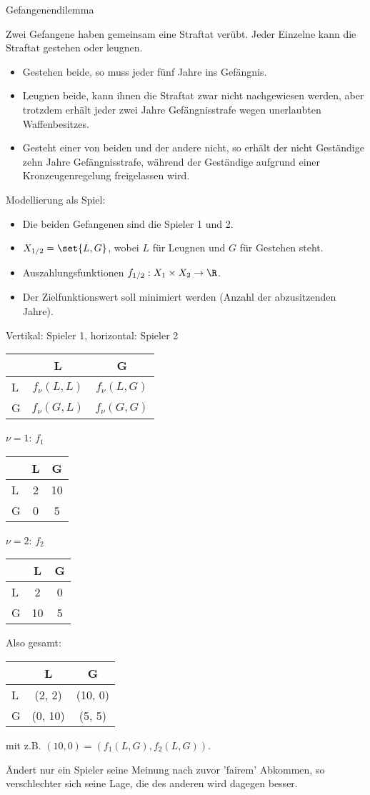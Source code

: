 \begin{beispiel} Gefangenendilemma

Zwei Gefangene haben gemeinsam eine Straftat verübt. Jeder Einzelne kann die Straftat gestehen oder leugnen.
\begin{itemize}
\item Gestehen beide, so muss jeder fünf Jahre ins Gefängnis.
\item Leugnen beide, kann ihnen die Straftat zwar nicht nachgewiesen werden, aber trotzdem erhält jeder zwei Jahre Gefängnisstrafe wegen unerlaubten Waffenbesitzes. 
\item Gesteht einer von beiden und der andere nicht, so erhält der nicht Geständige zehn Jahre Gefängnisstrafe, während der Geständige aufgrund einer Kronzeugenregelung freigelassen wird.  
\end{itemize}
Modellierung als Spiel:
\begin{itemize}
\item Die beiden Gefangenen sind die Spieler 1 und 2. 
\item $X_{1/2} = \set{L, G}$, wobei $L$ für Leugnen und $G$ für Gestehen steht. 
\item Auszahlungsfunktionen $f_{1/2}: X_{1} \times X_{2} \to \R$. 
\item Der Zielfunktionswert soll minimiert werden (Anzahl der abzusitzenden Jahre). 
\end{itemize}

Vertikal: Spieler 1, horizontal: Spieler 2

\begin{tabular}[h!]{l| c c}
    & L & G \\\hline 
  L & $f_{\nu}(L, L)$ & $f_{\nu}(L, G)$ \\ 
  G &$ f_{\nu}(G, L)$ & $f_{\nu}(G, G)$ 
\end{tabular}

\vspace{3mm}

$\nu = 1$: $f_{1}$
\begin{tabular}[h!]{l| c c}
    & L & G \\\hline 
  L & 2 & 10 \\ 
  G & 0 &  5 
\end{tabular}

$\nu = 2$: $f_{2}$
\begin{tabular}[h!]{l| c c}
    & L & G \\\hline 
  L &  2& 0 \\
  G & 10& 5
\end{tabular}

\vspace{3mm}

Also gesamt: 
\begin{tabular}[h!]{l| c c}
    & L & G \\\hline 
  L &  (2, 2)& (10, 0) \\
  G & (0, 10)&  (5, 5)
\end{tabular}

 mit z.B. $(10, 0) = (f_{1}(L, G), f_{2}(L, G))$.

Ändert nur ein Spieler seine Meinung nach zuvor 'fairem' Abkommen, so verschlechter sich seine Lage, die des anderen wird dagegen besser.
\end{beispiel}
